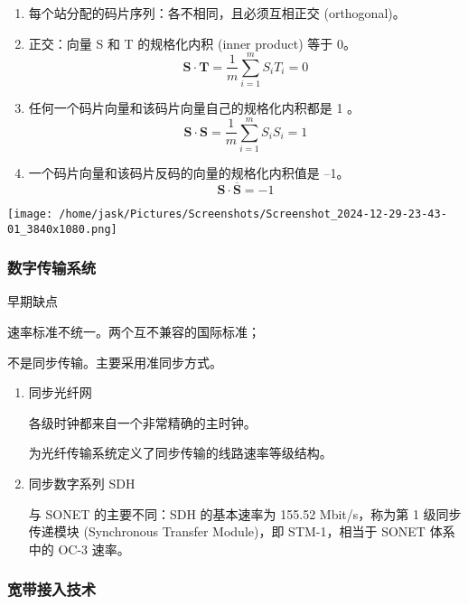\documentclass[11pt]{article}
\begin{document}
\begin{enumerate}
\begin{enumerate}
\begin{enumerate}
\begin{enumerate}
\item 每个站分配的码片序列：各不相同，且必须互相正交 (orthogonal)。
\item 正交：向量 S 和 T 的规格化内积 (inner product) 等于 0。
\begin{equation}
  \mathbf{S} \cdot \mathbf{T} = \frac{1}{m}  \sum_{i=1}^m S_i T_i=0
\end{equation}
\item 任何一个码片向量和该码片向量自己的规格化内积都是 1 。
\begin{equation}
  \mathbf{S} \cdot \mathbf{S} = \frac{1}{m} \sum_{i=1}^m S_i S_i=1
\end{equation}
\item 一个码片向量和该码片反码的向量的规格化内积值是 –1。
\[
     \mathbf{S} \cdot \overline{\mathbf{S}} = -1
   \]
\end{enumerate}

\begin{center}
\texttt{[image: /home/jask/Pictures/Screenshots/Screenshot\_2024-12-29-23-43-01\_3840x1080.png]}
\end{center}
\end{enumerate}
\end{enumerate}
\end{enumerate}
\subsubsection{数字传输系统}
\label{sec:orgefe60ce}

早期缺点

速率标准不统一。两个互不兼容的国际标准；

不是同步传输。主要采用准同步方式。
\begin{enumerate}
\item 同步光纤网
\label{sec:orgd3971bc}

各级时钟都来自一个非常精确的主时钟。 

为光纤传输系统定义了同步传输的线路速率等级结构。
\item 同步数字系列 SDH
\label{sec:orged784cb}

与 SONET 的主要不同：SDH 的基本速率为 155.52 Mbit/s，称为第 1 级同步传递模块 (Synchronous Transfer Module)，即 STM-1，相当于 SONET 体系中的 OC-3 速率。
\end{enumerate}
\subsubsection{宽带接入技术}
\label{sec:orgc97e4af}
\end{document}

